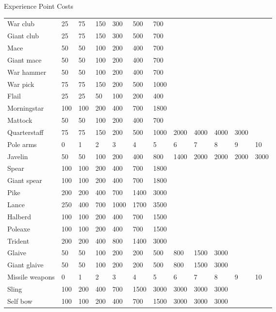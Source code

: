\begin{Table}{Experience Point Costs}
\begin{tabularx}{\linewidth}{Xlllllllllll}
War club		& 25	& 75 	& 150	& 300	& 500	& 700	& 	& 	& 	& 	&  \\
Giant club		& 25	& 75 	& 150	& 300	& 500	& 700	& 	& 	& 	& 	&  \\
Mace			& 50	& 50 	& 100	& 200	& 400	& 700	& 	& 	& 	& 	&  \\
Giant mace		& 50	& 50 	& 100	& 200	& 400	& 700	& 	& 	& 	& 	&  \\
War hammer		& 50	& 50 	& 100	& 200	& 400	& 700	& 	& 	& 	& 	&  \\
War pick		& 75	& 75 	& 150	& 200	& 500	& 1000	& 	& 	& 	& 	&  \\
Flail			& 25	& 25 	& 50	& 100	& 200	& 400	& 	& 	& 	& 	&  \\
Morningstar		& 100	& 100 	& 200	& 400	& 700	& 1800	& 	& 	& 	& 	&  \\
Mattock			& 50	& 50 	& 100	& 200	& 400	& 700	& 	& 	& 	& 	&  \\
Quarterstaff		& 75	& 75 	& 150	& 200	& 500	& 1000	& 2000	& 4000	& 4000	& 3000	&  \\ \hline
Pole arms		& 0	& 1 	& 2	& 3	& 4	& 5	& 6	& 7	& 8	& 9	& 10 \\ \hline
Javelin			& 50	& 50 	& 100	& 200	& 400	& 800	& 1400	& 2000	& 2000	& 2000	& 3000 \\
Spear			& 100	& 100 	& 200	& 400	& 700	& 1800	& 	& 	& 	& 	&  \\
Giant spear		& 100	& 100 	& 200	& 400	& 700	& 1800	& 	& 	& 	& 	&  \\
Pike			& 200	& 200 	& 400	& 700	& 1400	& 3000	& 	& 	& 	& 	&  \\
Lance			& 250	& 400 	& 700	& 1000	& 1700	& 3500	& 	& 	& 	& 	&  \\
Halberd			& 100	& 100 	& 200	& 400	& 700	& 1500	& 	& 	& 	& 	&  \\
Poleaxe			& 100	& 100 	& 200	& 400	& 700	& 1500	& 	& 	& 	& 	&  \\
Trident			& 200	& 200 	& 400	& 800 	& 1400	& 3000	& 	& 	& 	& 	&  \\
Glaive			& 50	& 50	& 100	& 200	& 200	& 500	& 800	& 1500	& 3000	& 	&  \\
Giant glaive		& 50	& 50	& 100	& 200	& 200	& 500	& 800	& 1500	& 3000	& 	&  \\ \hline
Missile weapons		& 0	& 1 	& 2	& 3	& 4	& 5	& 6	& 7	& 8	& 9	& 10 \\ \hline
Sling			& 100	& 200 	& 400	& 700	& 1500	& 3000	& 3000	& 3000	& 3000	& 	&  \\
Self bow		& 100	& 100 	& 200	& 400	& 700	& 1500	& 3000	& 3000	& 3000	& 	&  \\

\end{tabularx}
\end{Table}
